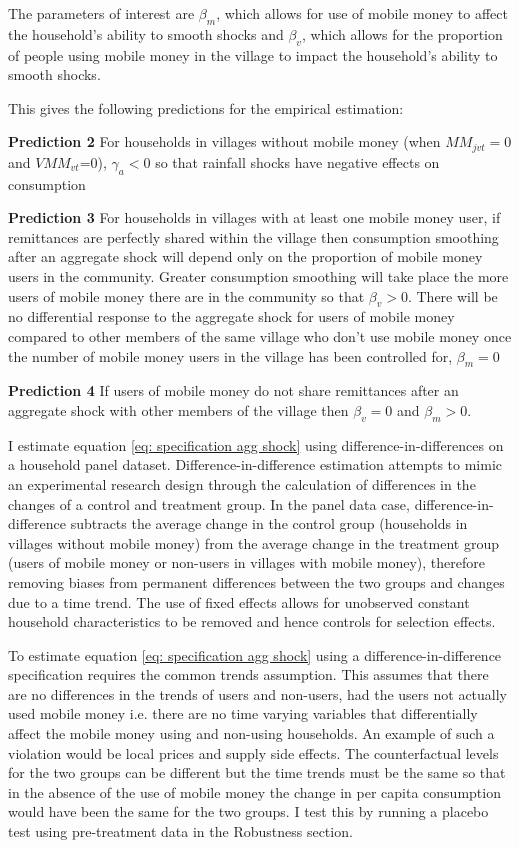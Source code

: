 The parameters of interest are $\beta_m $,  which allows for use of mobile money to affect the household's ability to smooth shocks and $\beta_v$, which allows for the proportion of people using mobile money in the village to impact the household's ability to smooth shocks.

This gives the following predictions for the empirical estimation:
\begin{description}
\item{\bf{Prediction 2}} For households in villages without mobile money (when $MM_{jvt}=0$ and $VMM_{vt}$=0), $\gamma_a<0$ so that rainfall shocks have negative effects on consumption
\item{\bf{Prediction 3}} For households in villages with at least one mobile money user, if remittances are perfectly shared within the village then consumption smoothing after an aggregate shock will depend only on the proportion of mobile money users in the community. Greater consumption smoothing will take place the more users of mobile money there are in the community so that $\beta_v >0$. There will be no 
differential response to the aggregate shock for users of mobile money compared to other members of the same village who don't use mobile money once the number of mobile money users in the village has been controlled for, $\beta_m=0$
\item{\bf{Prediction 4}} If users of mobile money do not share remittances after an aggregate shock with other members of the village then $\beta_v=0$ and $\beta_m>0$. 
\end{description}

I estimate equation \eqref{eq: specification agg shock} using difference-in-differences on a household panel dataset. Difference-in-difference estimation attempts to mimic an experimental research design through the calculation of differences in the changes of a control and treatment group. In the panel data case, difference-in-difference subtracts the average change in the control group (households in villages without mobile money) from the average change in the treatment group (users of mobile money or non-users in villages with mobile money), therefore removing biases from permanent differences between the two groups and changes due to a time trend. The use of fixed effects allows for unobserved constant household characteristics to be removed and hence controls for selection effects. 

To estimate equation \eqref{eq: specification agg shock} using a difference-in-difference specification requires the common trends assumption. This assumes that there are no differences in the trends of users and non-users, had the users not actually used mobile money i.e. there are no time varying variables that differentially affect the mobile money using and non-using households. An example of such a violation would be local prices and supply side effects. The counterfactual levels for the two groups can be different but the time trends must be the same so that in the absence of the use of mobile money the change in per capita consumption would have been the same for the two groups. I test this by running a placebo test using pre-treatment data in the Robustness section.

